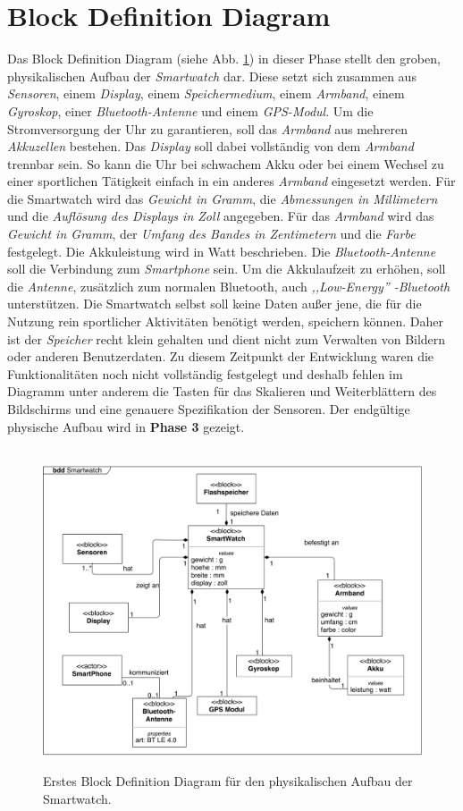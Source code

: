 \section{Block Definition Diagram}
\label{sec:blockdefinitiondiagram}

Das Block Definition Diagram (siehe Abb. \ref{fig:block1}) in dieser Phase stellt den groben, physikalischen Aufbau der \textit{Smartwatch} dar. Diese setzt sich zusammen aus \textit{Sensoren}, einem \textit{Display}, einem \textit{Speichermedium}, einem \textit{Armband}, einem \textit{Gyroskop}, einer \textit{Bluetooth-Antenne} und einem \textit{GPS-Modul}. Um die Stromversorgung der Uhr zu garantieren, soll das \textit{Armband} aus mehreren \textit{Akkuzellen} bestehen. Das \textit{Display} soll dabei vollständig von dem \textit{Armband} trennbar sein. So kann die Uhr bei schwachem Akku oder bei einem Wechsel zu einer sportlichen Tätigkeit einfach in ein anderes \textit{Armband} eingesetzt werden. Für die Smartwatch wird das \textit{Gewicht in Gramm}, die \textit{Abmessungen in Millimetern} und die \textit{Auflösung des Displays in Zoll} angegeben. Für das \textit{Armband} wird das \textit{Gewicht in Gramm}, der \textit{Umfang des Bandes in Zentimetern} und die \textit{Farbe} festgelegt. Die Akkuleistung wird in Watt beschrieben. Die \textit{Bluetooth-Antenne} soll die Verbindung zum \textit{Smartphone} sein. Um die Akkulaufzeit zu erhöhen, soll die \textit{Antenne}, zusätzlich zum normalen Bluetooth, auch \textit{,,Low-Energy'' -Bluetooth} unterstützen. Die Smartwatch selbst soll keine Daten außer jene, die für die Nutzung rein sportlicher Aktivitäten benötigt werden, speichern können. Daher ist der \textit{Speicher} recht klein gehalten und dient nicht zum Verwalten von Bildern oder anderen Benutzerdaten.
Zu diesem Zeitpunkt der Entwicklung waren die Funktionalitäten noch nicht vollständig festgelegt und deshalb fehlen im Diagramm unter anderem die Tasten für das Skalieren und Weiterblättern des Bildschirms und eine genauere Spezifikation der Sensoren. Der endgültige physische Aufbau wird in \textbf{Phase 3} gezeigt.

\begin{figure}[h]
\centering\
\includegraphics[width=\textwidth]{img/block1}
\caption[Block Definition Diagram der Phase 1]{Erstes Block Definition Diagram für den physikalischen Aufbau der Smartwatch.}\label{fig:block1}
\end{figure}

